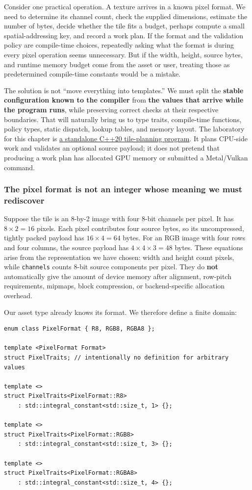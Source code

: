 Consider one practical operation. A texture arrives in a known pixel format. We need to determine its channel count, check the supplied dimensions, estimate the number of bytes, decide whether the tile fits a budget, perhaps compute a small spatial-addressing key, and record a work plan. If the format and the validation policy are compile-time choices, repeatedly asking what the format is during every pixel operation seems unnecessary. But if the width, height, source bytes, and runtime memory budget come from the asset or user, treating those as predetermined compile-time constants would be a mistake.

The solution is not ``move everything into templates.'' We must split the \textbf{stable configuration known to the compiler} from \textbf{the values that arrive while the program runs}, while preserving correct checks at their respective boundaries. That will naturally bring us to type traits, compile-time functions, policy types, static dispatch, lookup tables, and memory layout. The laboratory for this chapter is \href{tools/labs/compile_time_asset_policy_lab.cpp}{a standalone C++20 tile-planning program}. It plans CPU-side work and validates an optional source payload; it does not pretend that producing a work plan has allocated GPU memory or submitted a Metal/Vulkan command.

\subsubsection{The pixel format is not an integer whose meaning we must rediscover}\label{the-pixel-format-is-not-an-integer-whose-meaning-we-must-rediscover}

Suppose the tile is an 8-by-2 image with four 8-bit channels per pixel. It has \(8\times 2=16\) pixels. Each pixel contributes four source bytes, so its uncompressed, tightly packed payload has \(16\times4=64\) bytes. For an RGB image with four rows and four columns, the source payload has \(4\times4\times3=48\) bytes. These equations arise from the representation we have chosen: width and height count pixels, while \texttt{channels} counts 8-bit source components per pixel. They do \textbf{not} automatically give the amount of device memory after alignment, row-pitch requirements, mipmaps, block compression, or backend-specific allocation overhead.

Our asset type already knows its format. We therefore define a finite domain:

\begin{verbatim}
enum class PixelFormat { R8, RGB8, RGBA8 };

template <PixelFormat Format>
struct PixelTraits; // intentionally no definition for arbitrary values

template <>
struct PixelTraits<PixelFormat::R8>
    : std::integral_constant<std::size_t, 1> {};

template <>
struct PixelTraits<PixelFormat::RGB8>
    : std::integral_constant<std::size_t, 3> {};

template <>
struct PixelTraits<PixelFormat::RGBA8>
    : std::integral_constant<std::size_t, 4> {};
\end{verbatim}

